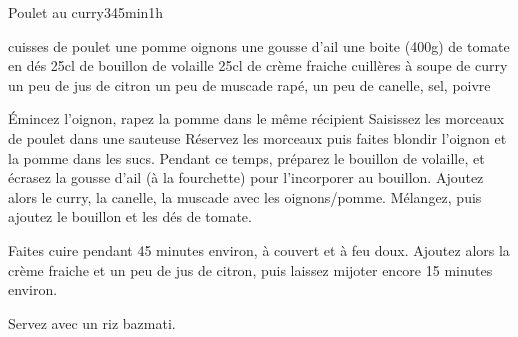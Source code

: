 \begin{recette}{Poulet au curry}{3}{45min}{1h}

\begin{ingredients}
 cuisses de poulet
\ingredient une pomme
 oignons
\ingredient une gousse d'ail
\ingredient une boite (400g) de tomate en dés 
\ingredient 25cl de bouillon de volaille
\ingredient 25cl de crème fraiche
 cuillères à soupe de curry
\ingredient un peu de jus de citron
\ingredient un peu de muscade rapé, un peu de canelle, sel, poivre
\end{ingredients}

\begin{preparation}
\etape Émincez l'oignon, rapez la pomme dans le même récipient
\etape Saisissez les morceaux de poulet dans une sauteuse
\etape Réservez les morceaux puis faites blondir l'oignon et la pomme dans les sucs.
\etape Pendant ce temps, préparez le bouillon de volaille, et écrasez la gousse d'ail (à la fourchette) pour l'incorporer au 
bouillon.
\etape Ajoutez alors le curry, la canelle, la muscade avec les oignons/pomme. Mélangez, puis ajoutez le bouillon et les dés de 
tomate. 
\end{preparation}

\begin{cuisson}
Faites cuire pendant 45 minutes environ, à couvert et à feu doux. Ajoutez alors la crème fraiche et un peu de jus 
de citron, puis laissez mijoter encore 15 minutes environ. 

Servez avec un riz bazmati.
\end{cuisson}
\end{recette}

